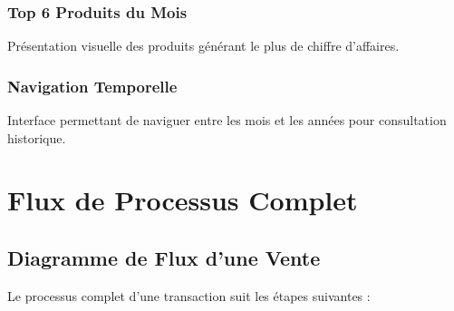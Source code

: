 \documentclass[12pt,a4paper]{report}
\begin{document}
\subsection{Top 6 Produits du Mois}

Présentation visuelle des produits générant le plus de chiffre d'affaires.

\subsection{Navigation Temporelle}

Interface permettant de naviguer entre les mois et les années pour consultation historique.

\pagebreak

\chapter{Flux de Processus Complet}

\section{Diagramme de Flux d'une Vente}

Le processus complet d'une transaction suit les étapes suivantes :
\end{document}

